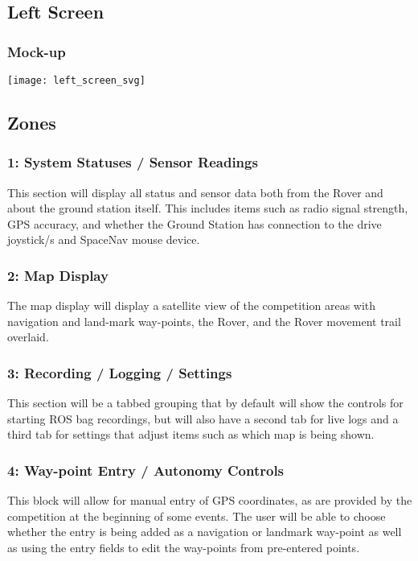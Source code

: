 \subsection{Left Screen}
\subsubsection{Mock-up}
\vspace{1em}
\begin{minipage}{\linewidth}
  \begin{center}
  \texttt{[image: left\_screen\_svg]}
  \end{center}
\end{minipage}

\subsection{Zones}
\subsubsection{1: System Statuses / Sensor Readings}
This section will display all status and sensor data both from the Rover and about the ground station itself.
This includes items such as radio signal strength, GPS accuracy, and whether the Ground Station has connection to the drive joystick/s and SpaceNav mouse device.

\subsubsection{2: Map Display}
The map display will display a satellite view of the competition areas with navigation and land-mark way-points, the Rover, and the Rover movement trail overlaid.

\subsubsection{3: Recording / Logging / Settings}
This section will be a tabbed grouping that by default will show the controls for starting ROS bag recordings, but will also have a second tab for live logs and a third tab for settings that adjust items such as which map is being shown.

\subsubsection{4: Way-point Entry / Autonomy Controls}
This block will allow for manual entry of GPS coordinates, as are provided by the competition at the beginning of some events.
The user will be able to choose whether the entry is being added as a navigation or landmark way-point as well as using the entry fields to edit the way-points from pre-entered points.


